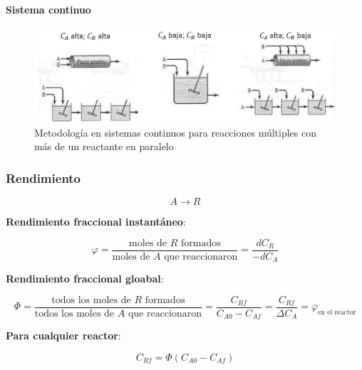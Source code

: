         \textbf{Sistema continuo}
        
        \begin{figure}
            \centering
            \includegraphics[width=\textwidth]{img/esquemas/sistema_continuo_paralelo.png}
            \caption{Metodología en sistemas continuos para reacciones múltiples con más de un reactante en paralelo}
            \label{fig:sistema_continuo_paralelo}
        \end{figure}
        
        \subsubsection{Rendimiento}
        
        \[A \rightarrow R\]
        
        \textbf{Rendimiento fraccional instantáneo}:
        
        \begin{equation}
        \label{eq:rendimiento_fraccional_instantaneo}
            \varphi = \frac{\text{moles de } R \text{ formados}}{\text{moles de } A \text{ que reaccionaron}} = \frac{d{C}_{R}}{-d{C}_{A}}
        \end{equation}
        
        \textbf{Rendimiento fraccional gloabal}:
        
        \begin{equation}
        \label{eq:rendimiento_fraccional_global}
            \Phi = \frac{\text{todos los moles de } R \text{ formados}}{\text{todos los moles de } A \text{ que reaccionaron}} = \frac{C_{Rf}}{C_{A0}-C_{Af}} = \frac{C_{Rf}}{\Delta C_{A}} = \overline{\varphi}_{\text{en el reactor}}
        \end{equation}
        
        \textbf{Para cualquier reactor}:
        
        \begin{equation}
        \label{eq:equivalencia_rendimiento_fraccional}
            C_{Rf} = \Phi \left ( C_{A0} - C_{Af} \right )
        \end{equation}
        
